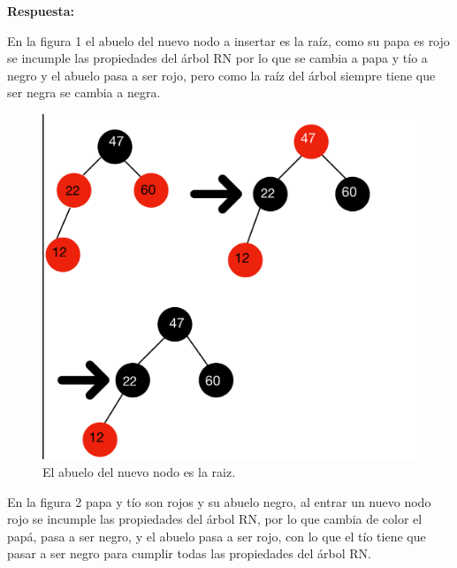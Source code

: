 \documentclass[11pt]{article}
\begin{document}
\begin{itemize}
\textbf{Respuesta:}

En la figura 1 el abuelo del nuevo nodo a insertar es la raíz, como su papa es rojo se incumple las propiedades del árbol RN por lo que se cambia a papa y tío a negro y el abuelo pasa a ser rojo, pero como la raíz del árbol siempre tiene que ser negra se cambia a negra.
\begin{figure}[H]
    \centering
    \includegraphics[scale=.15]{IMG-2099.jpg}
    \caption{El abuelo del nuevo nodo es la raiz.}
    \label{}
 \end{figure}
En la figura 2 papa y tío son rojos y su abuelo negro, al entrar  un nuevo nodo rojo se incumple las propiedades del árbol RN, por lo que  cambia de color el papá, pasa a ser negro, y el abuelo pasa a ser rojo, con lo que el tío tiene que pasar a ser negro para cumplir todas las propiedades del árbol RN.   


\end{itemize}
\end{document}
